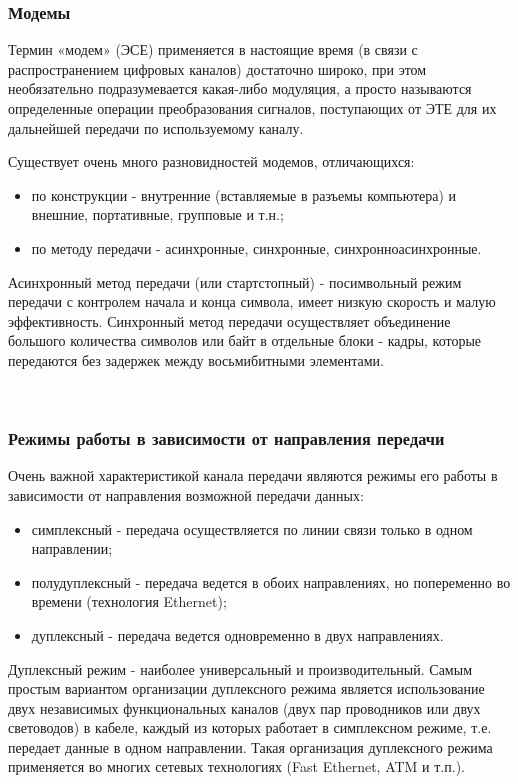 \documentclass[a4paper]{report}
\begin{document}
\subsubsection{Модемы}
Термин «модем» (ЭСЕ) применяется в настоящие время (в связи с распространением цифровых каналов) достаточно широко, при этом необязательно подразумевается какая-либо модуляция, а просто называются определенные операции преобразования сигналов, поступающих от ЭТЕ для их дальнейшей передачи по используемому каналу.

Существует очень много разновидностей модемов, отличающихся:
\begin{itemize}
\item по конструкции - внутренние (вставляемые в разъемы компьютера) и внешние, портативные, групповые и т.н.;
\item по методу передачи - асинхронные, синхронные, синхронноасинхронные.
\end{itemize}

Асинхронный метод передачи (или стартстопный) - посимвольный режим передачи с контролем начала и конца символа, имеет низкую скорость и малую эффективность. Синхронный метод передачи осуществляет объединение большого количества символов или байт в отдельные блоки - кадры, которые передаются без задержек между восьмибитными элементами.

~

\subsubsection{Режимы работы в зависимости от направления передачи}
Очень важной характеристикой канала передачи являются режимы его работы в зависимости от направления возможной передачи данных:
\begin{itemize}
\item симплексный - передача осуществляется по линии связи только в одном направлении;
\item полудуплексный - передача ведется в обоих направлениях, но попеременно во времени (технология Ethernet);
\item дуплексный - передача ведется одновременно в двух направлениях.
\end{itemize}

Дуплексный режим - наиболее универсальный и производительный. Самым простым вариантом организации дуплексного режима является использование двух независимых функциональных каналов (двух пар проводников или двух световодов) в кабеле, каждый из которых работает в симплексном режиме, т.е. передает данные в одном направлении. Такая организация дуплексного режима применяется во многих сетевых технологиях (Fast Ethernet, ATM и т.п.).
\end{document}
